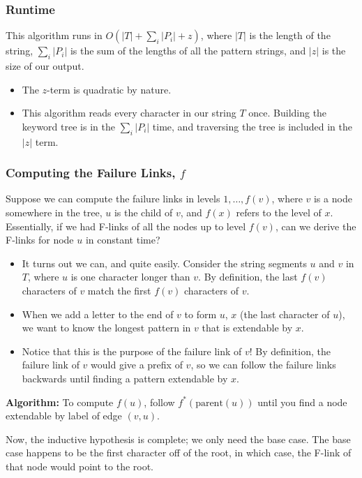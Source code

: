 \documentclass[10pt]{article}
\begin{document}
\subsubsection*{Runtime}
This algorithm runs in $O(|T| + \sum_i |P_i| + z)$, where $|T|$ is the length of the string, $\sum_i |P_i|$ is the sum of the lengths of all the pattern strings, and $|z|$ is the size of our output. 
\begin{itemize}
	\item The $z$-term is quadratic by nature.
	\item This algorithm reads every character in our string $T$ once.  Building the keyword tree is in the $\sum_i |P_i|$ time, and traversing the tree is included in the $|z|$ term.
\end{itemize}

\subsubsection*{Computing the Failure Links, $f$}
Suppose we can compute the failure links in levels $1, \dots, f(v)$, where $v$ is a node somewhere in the tree, $u$ is the child of $v$, and $f(x)$ refers to the level of $x$.  Essentially, if we had F-links of all the nodes up to level $f(v)$, can we derive the F-links for node $u$ in constant time?
\begin{itemize}
	\item It turns out we can, and quite easily.  Consider the string segments $u$ and $v$ in $T$, where $u$ is one character longer than $v$.  By definition, the last $f(v)$ characters of $v$ match the first $f(v)$ characters of $v$.
	\item When we add a letter to the end of $v$ to form $u$, $x$ (the last character of $u$), we want to know the longest pattern in $v$ that is extendable by $x$.
	\item Notice that this is the purpose of the failure link of $v$!  By definition, the failure link of $v$ would give a prefix of $v$, so we can follow the failure links backwards until finding a pattern extendable by $x$.
\end{itemize}
\begin{center}
\textbf{Algorithm:} To compute $f(u)$, follow $f^*(\text{parent}(u))$ until you find a node extendable by label of edge $(v, u)$.
\end{center}
Now, the inductive hypothesis is complete; we only need the base case.  The base case happens to be the first character off of the root, in which case, the F-link of that node would point to the root.\\\\
\end{document}

